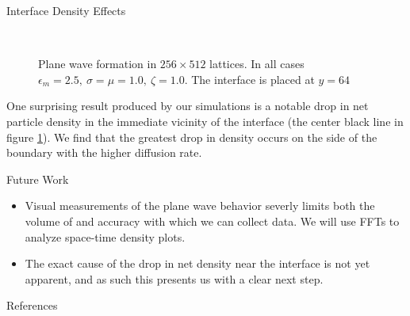 \documentclass{beamer}
\begin{document}
\begin{frame}{}
\begin{textblock}{0.32}
\begin{block}{Interface Density Effects}
\begin{figure}[h]
            \\
            \caption{\centering Plane wave formation in $256 \times 512$ lattices. In all cases $\epsilon_m = 2.5, \ \sigma = \mu = 1.0, \ \zeta = 1.0$. The interface is placed at $y = 64$}
            \label{fig:void}
        \end{figure}
        One surprising result produced by our simulations is a notable drop in 
        net particle density in the immediate vicinity of the interface (the center 
        black line in figure \ref{fig:void}). We find that the greatest drop in density 
        occurs on the side of the boundary with the higher diffusion rate. 
    \end{block}
    \begin{block}{Future Work}
        \begin{itemize}
            \item Visual measurements of the plane wave behavior severly limits both
                  the volume of and accuracy with which we can collect data. 
                  We will use FFTs to analyze space-time density plots.
            \item The exact cause of the drop in net density near the interface is 
                  not yet apparent, and as such this presents us with a clear next
                  step.
        \end{itemize}
    \end{block}
    \begin{block}{References}
        
        
        

\end{block}
\end{textblock}
\end{frame}
\end{document}
